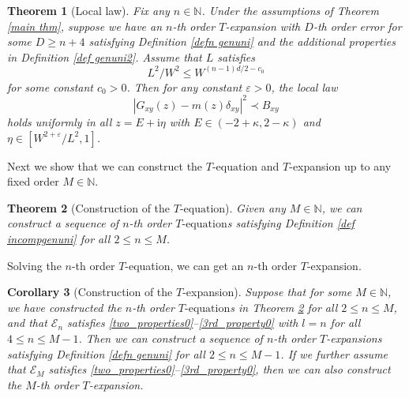 \documentclass{article}
\newcommand{\1}{\mathds{1}}
\numberwithin{equation}{section}
\newcommand{\be}{\begin{equation}}
\newcommand{\ee}{\end{equation}}
\newcommand{\e}{{\varepsilon}}
\newcommand{\ii}{\mathrm{i}} %
\renewcommand{\leq}{\leqslant}
\renewcommand{\geq}{\geqslant}
\renewcommand{\le}{\leq}
\renewcommand{\ge}{\geq}
\newcommand{\N}{\mathbb{N}}
\theoremstyle{plain} %
\newtheorem{theorem}{Theorem}[section]
\newtheorem{corollary}[theorem]{Corollary}
\theoremstyle{remark}
\newcommand{\cor}{\color{red}}
\newcommand{\Sele}{{\mathcal E}}
\newcommand{\incomp}{{\text{$T$-equation}}}
\begin{document}
\begin{theorem}[Local law]\label{thm ptree}
	Fix any $n\in \N$. Under the assumptions of Theorem \ref{main thm}, suppose we have an $n$-th order $T$-expansion with $D$-th order error for some $D\ge n+4$ satisfying Definition \ref{defn genuni} and the additional properties in Definition \ref{def genuni2}. Assume that $L$ satisfies
	\be\label{Lcondition1}  {L^2}/{W^2}  \le W^{(n-1)d/2-c_0} \ee
	for some constant $c_0>0$. Then for any constant $\e>0$, the local law %
	\be\label{locallaw1}
	|G_{xy} (z) -m(z)\delta_{xy}|^2 \prec B_{xy}
	\ee
	holds uniformly in all $z= E+\ii\eta$ with $E\in (-2+\kappa,2-\kappa)$ and $\eta \in [W^{2+\e}/L^{2},1]$.
\end{theorem}




Next we show that we can construct the $\incomp$ and $T$-expansion up to any fixed order $M\in \N$.


\begin{theorem}[Construction of the $\incomp$]   \label{incomplete Texp} 
Given any $M\in \N$, %
we can construct a sequence of $n$-th order $\incomp$s satisfying Definition \ref{def incompgenuni} for all $2\le n \le M$.
\end{theorem} 

Solving the $n$-th order $T$-equation, we can get an $n$-th order $T$-expansion. 

\begin{corollary}[Construction of the $T$-expansion]  \label{lem completeTexp} 
Suppose that for some $M\in \N$, we have constructed the $n$-th order $\incomp$s in Theorem \ref{incomplete Texp} for all $2\le n\le M$, and that $\Sele_n$ satisfies \eqref{two_properties0}--\eqref{3rd_property0} with $l=n$ for all $4\le n\le M-1$. Then we can construct a sequence of $n$-th order $T$-expansions satisfying Definition \ref{defn genuni} for all $2\le n\le M-1$. If we further assume that $\Sele_M$ satisfies \eqref{two_properties0}--\eqref{3rd_property0}, then we can also construct the $M$-th order $T$-expansion. 
\end{corollary}
\end{document}
